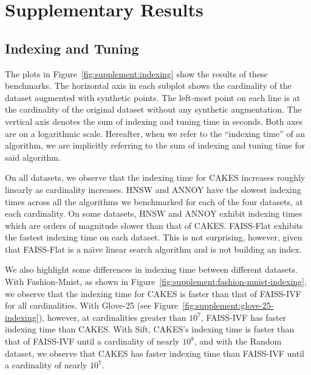 \documentclass[review,supplement,onefignum,onetabnum]{siamonline220329}
\begin{document}
\section{Supplementary Results}

\subsection{Indexing and Tuning}

The plots in Figure~\ref{fig:supplement:indexing} show the results of these benchmarks.
The horizontal axis in each subplot shows the cardinality of the dataset augmented with synthetic points.
The left-most point on each line is at the cardinality of the original dataset without any synthetic augmentation.
The vertical axis denotes the sum of indexing and tuning time in seconds.
Both axes are on a logarithmic scale.
Hereafter, when we refer to the ``indexing time'' of an algorithm, we are implicitly referring to the sum of indexing and tuning time for said algorithm.

On all datasets, we observe that the indexing time for CAKES increases roughly linearly as cardinality increases.
HNSW and ANNOY have the slowest indexing times across all the algorithms we benchmarked for each of the four datasets, at each cardinality.
On some datasets, HNSW and ANNOY exhibit indexing times which are orders of magnitude slower than that of CAKES.
FAISS-Flat exhibits the fastest indexing time on each dataset.
This is not surprising, however, given that FAISS-Flat is a na\"{\i}ve linear search algorithm and is not building an index.

We also highlight some differences in indexing time between different datasets.
With Fashion-Mnist, as shown in Figure~\ref{fig:supplement:fashion-mnist-indexing}, we observe that the indexing time for CAKES is faster than that of FAISS-IVF for all cardinalities.
With Glove-25 (see Figure~\ref{fig:supplement:glove-25-indexing}), however, at cardinalities greater than $10^7$, FAISS-IVF has faster indexing time than CAKES.
With Sift, CAKES's indexing time is faster than that of FAISS-IVF until a cardinality of nearly $10^8$, and with the Random dataset, we observe that CAKES has faster indexing time than FAISS-IVF until a cardinality of nearly $10^7$.
\end{document}
